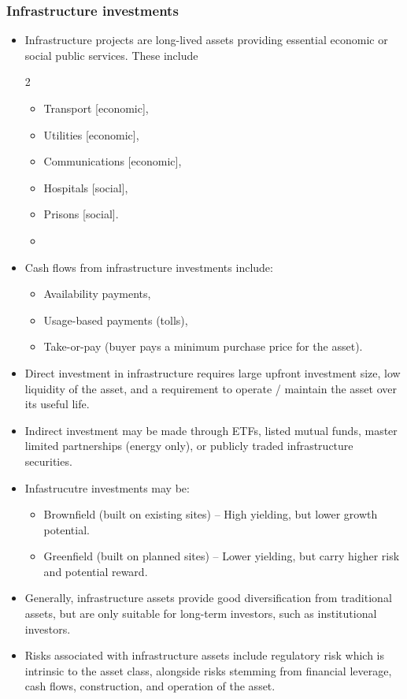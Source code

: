 \documentclass[../notes_compiled.tex]{subfiles}
\begin{document}
\subsubsection{Infrastructure investments}
\begin{itemize}
\item Infrastructure projects are long-lived assets providing essential economic or social public services. These include
\begin{multicols}{2}
\begin{itemize}
\item Transport [economic],
\item Utilities [economic],
\item Communications [economic],
\item Hospitals [social],
\item Prisons [social].
\item[]
\end{itemize}
\end{multicols}
\item Cash flows from infrastructure investments include:
\begin{itemize}
\item Availability payments,
\item Usage-based payments (tolls),
\item Take-or-pay (buyer pays a minimum purchase price for the asset).
\end{itemize}
\item Direct investment in infrastructure requires large upfront investment size, low liquidity of the asset, and a requirement to operate / maintain the asset over its useful life.
\item Indirect investment may be made through ETFs, listed mutual funds, master limited partnerships (energy only), or publicly traded infrastructure securities.
\item Infastrucutre investments may be:
\begin{itemize}
\item Brownfield (built on existing sites) -- High yielding, but lower growth potential.
\item Greenfield (built on planned sites) -- Lower yielding, but carry higher risk and potential reward.
\end{itemize}
\item Generally, infrastructure assets provide good diversification from traditional assets, but are only suitable for long-term investors, such as institutional investors.
\item Risks associated with infrastructure assets include regulatory risk which is intrinsic to the asset class, alongside risks stemming from financial leverage, cash flows, construction, and operation of the asset.
\end{itemize}
\end{document}
